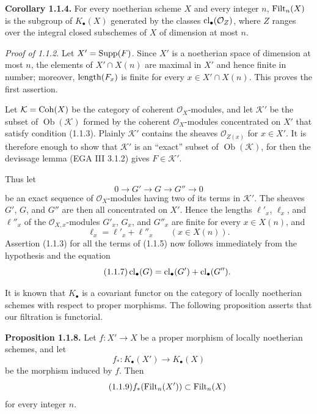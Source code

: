 \textbf{Corollary 1.1.4.}
For every noetherian scheme $X$ and every integer $n$, $\operatorname{Filt}_n(X)$ is the
subgroup of $K_\bullet(X)$ generated by the classes
$\operatorname{cl}_\bullet(\mathcal O_Z)$, where $Z$ ranges over the integral closed
subschemes of $X$ of dimension at most $n$.

\emph{Proof of 1.1.2.}
Let $X'=\operatorname{Supp}(F)$. Since $X'$ is a noetherian space of dimension at most $n$,
the elements of $X'\cap X(n)$ are maximal in $X'$ and hence finite in number;
moreover, $\operatorname{length}(F_x)$ is finite for every $x\in X'\cap X(n)$. This proves
the first assertion.

Let $\mathcal K=\operatorname{Coh}(X)$ be the category of coherent $\mathcal O_X$-modules,
and let $\mathcal K'$ be the subset of $\operatorname{Ob}(\mathcal K)$ formed
by the coherent $\mathcal O_X$-modules concentrated on $X'$ that satisfy
condition (1.1.3). Plainly $\mathcal K'$ contains the sheaves
$\mathcal O_{Z(x)}$ for $x\in X'$. It is therefore enough to show that
$\mathcal K'$ is an ``exact'' subset of $\operatorname{Ob}(\mathcal K)$,
for then the devissage lemma (EGA III 3.1.2) gives $F\in\mathcal K'$.

Thus let
\begin{equation}\tag{1.1.5}
0\longrightarrow G'\longrightarrow G\longrightarrow G''\longrightarrow0
\end{equation}
be an exact sequence of $\mathcal O_X$-modules having two of its terms in
$\mathcal K'$. The sheaves $G'$, $G$, and $G''$ are then all concentrated on
$X'$. Hence the lengths $\ell'_x$, $\ell_x$, and $\ell''_x$ of the
$\mathcal O_{X,x}$-modules $G'_x$, $G_x$, and $G''_x$ are finite for every
$x\in X(n)$, and
\begin{equation}\tag{1.1.6}
\ell_x=\ell'_x+\ell''_x\qquad(x\in X(n)).
\end{equation}
Assertion (1.1.3) for all the terms of (1.1.5) now follows immediately from
the hypothesis and the equation
\begin{equation}\tag{1.1.7}
\operatorname{cl}_\bullet(G)=\operatorname{cl}_\bullet(G')+\operatorname{cl}_\bullet(G'').
\end{equation}

It is known that $K_\bullet$ is a covariant functor on the category of locally
noetherian schemes with respect to proper morphisms. The following proposition
asserts that our filtration is functorial.

\textbf{Proposition 1.1.8.}
Let $f:X'\to X$ be a proper morphism of locally noetherian schemes, and let
\[
f_*:K_\bullet(X')\longrightarrow K_\bullet(X)
\]
be the morphism induced by $f$. Then
\begin{equation}\tag{1.1.9}
f_*(\operatorname{Filt}_n(X'))\subset\operatorname{Filt}_n(X)
\end{equation}
for every integer $n$.

